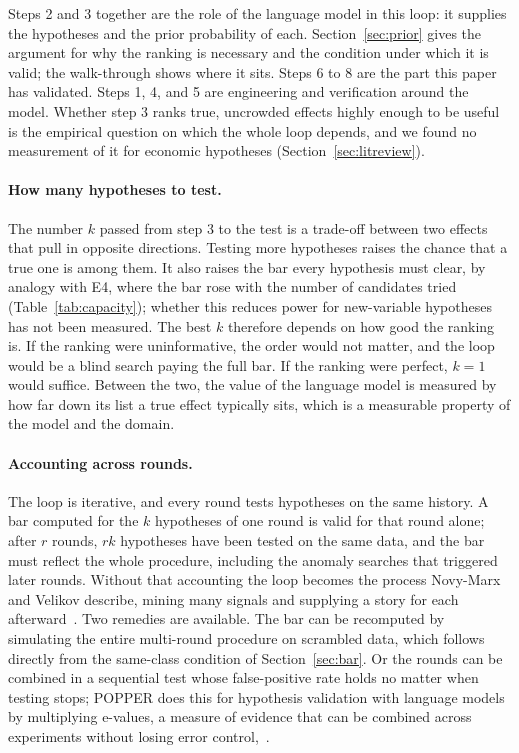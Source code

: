 \documentclass[11pt]{article}
\begin{document}
Steps 2 and 3 together are the role of the language model in this loop: it supplies the hypotheses and
the prior probability of each. Section~\ref{sec:prior} gives the argument for why the ranking is
necessary and the condition under which it is valid; the walk-through shows where it sits. Steps 6 to 8
are the part this paper has validated. Steps 1, 4, and 5 are engineering and verification around the
model. Whether step 3 ranks true, uncrowded effects highly enough to be useful is the empirical question
on which the whole loop depends, and we found no measurement of it for economic hypotheses
(Section~\ref{sec:litreview}).

\paragraph{How many hypotheses to test.} The number $k$ passed from step 3 to the test is a trade-off
between two effects that pull in opposite directions. Testing more hypotheses raises the chance that a
true one is among them. It also raises the bar every hypothesis must clear, by analogy with E4, where the
bar rose with the number of candidates tried (Table~\ref{tab:capacity}); whether this reduces power for
new-variable hypotheses has not been measured. The best $k$ therefore depends on how good the ranking
is. If the ranking were uninformative, the order would not matter, and the loop would be a
blind search paying the full bar. If the ranking were perfect, $k=1$ would suffice. Between the two, the
value of the language model is measured by how far down its list a true effect typically sits, which is a
measurable property of the model and the domain.

\paragraph{Accounting across rounds.} The loop is iterative, and every round tests hypotheses on the same
history. A bar computed for the $k$ hypotheses of one round is valid for that round alone; after $r$
rounds, $rk$ hypotheses have been tested on the same data, and the bar must reflect the whole procedure,
including the anomaly searches that triggered later rounds. Without that accounting the loop becomes the
process Novy-Marx and Velikov describe, mining many signals and supplying a story for each
afterward~\cite{novymarx}. Two remedies are available. The bar can be recomputed by simulating the entire
multi-round procedure on scrambled data, which follows directly from the same-class condition of
Section~\ref{sec:bar}. Or the rounds can be combined in a sequential test whose false-positive rate
holds no matter when testing stops; POPPER does this for hypothesis validation with language models by
multiplying e-values, a measure of evidence that can be combined across experiments without losing error control,~\cite{falsify}.
\end{document}
